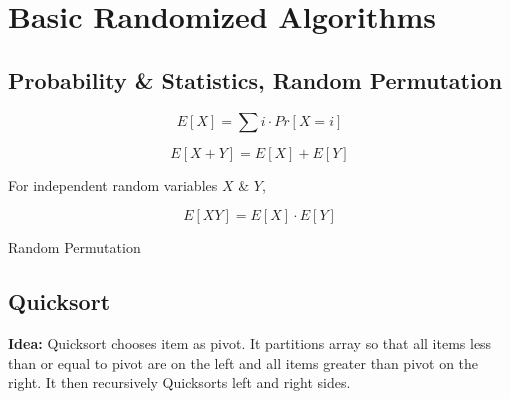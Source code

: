 \documentclass[10pt]{article}
\begin{document}
\newpage

\section{Basic Randomized Algorithms}

\subsection{Probability \& Statistics, Random Permutation}

$$
E[X] = \sum i \cdot Pr[X = i]
$$

$$
E[X+Y] = E[X] + E[Y]
$$

For independent random variables $X$ \& $Y$, 

$$
E[XY] = E[X] \cdot E[Y]
$$

\begin{algorithm}
	\SetAlgoLined
	\caption{Random Permutation}
\end{algorithm}

\subsection{Quicksort}

\textbf{Idea:} Quicksort chooses item as pivot. It partitions array so that all items less than or equal to pivot are on the left and all items greater than pivot on the right. It then recursively Quicksorts left and right sides.
\end{document}
